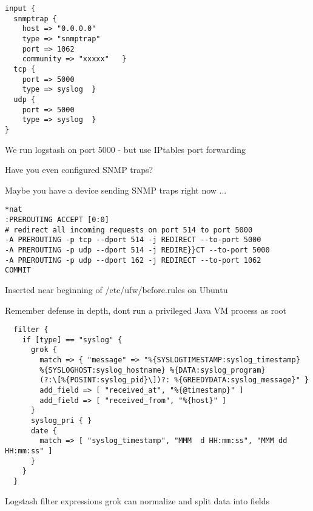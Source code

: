 \documentclass[Screen16to9,17pt]{foils}
\begin{document}

{\footnotesize
\begin{verbatim}
input {
  snmptrap {
    host => "0.0.0.0"
    type => "snmptrap"
    port => 1062
    community => "xxxxx"   }
  tcp {
    port => 5000
    type => syslog  }
  udp {
    port => 5000
    type => syslog  }
}
\end{verbatim}
}

\begin{list2}
\item We run logstash on port 5000 - but use IPtables port forwarding
\item Have you even configured SNMP traps?
\item Maybe you have a device sending SNMP traps right now ...
\end{list2}


{\footnotesize
\begin{verbatim}
*nat
:PREROUTING ACCEPT [0:0]
# redirect all incoming requests on port 514 to port 5000
-A PREROUTING -p tcp --dport 514 -j REDIRECT --to-port 5000
-A PREROUTING -p udp --dport 514 -j REDIRE}}CT --to-port 5000
-A PREROUTING -p udp --dport 162 -j REDIRECT --to-port 1062
COMMIT
\end{verbatim}
}

\centerline{Inserted near beginning of /etc/ufw/before.rules on Ubuntu}

Remember defense in depth, dont run a privileged Java VM process as root \smiley


{\footnotesize
\begin{verbatim}
  filter {
    if [type] == "syslog" {
      grok {
        match => { "message" => "%{SYSLOGTIMESTAMP:syslog_timestamp}
        %{SYSLOGHOST:syslog_hostname} %{DATA:syslog_program}
        (?:\[%{POSINT:syslog_pid}\])?: %{GREEDYDATA:syslog_message}" }
        add_field => [ "received_at", "%{@timestamp}" ]
        add_field => [ "received_from", "%{host}" ]
      }
      syslog_pri { }
      date {
        match => [ "syslog_timestamp", "MMM  d HH:mm:ss", "MMM dd HH:mm:ss" ]
      }
    }
  }
\end{verbatim}
}

\begin{list2}
\item Logstash filter expressions grok can normalize and split data into fields
\end{list2}
\end{document}
